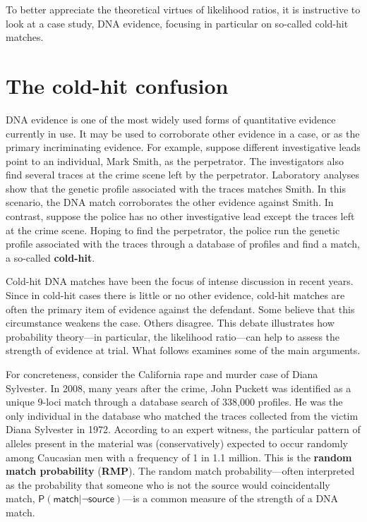 \documentclass[10pt,dvipsnames,enabledeprecatedfontcommands]{scrartcl}
\newcommand{\pr}[1]{\mathsf{P}(#1)}
\begin{document}
To better appreciate the theoretical virtues of likelihood ratios, it is
instructive to look at a case study, DNA evidence, focusing in
particular on so-called cold-hit matches.

\hypertarget{the-cold-hit-confusion}{%
\section{\texorpdfstring{The cold-hit confusion
\label{subsec:coldHitConfusion}}{The cold-hit confusion }}\label{the-cold-hit-confusion}}

DNA evidence is one of the most widely used forms of quantitative
evidence currently in use. It may be used to corroborate other evidence
in a case, or as the primary incriminating evidence. For example,
suppose different investigative leads point to an individual, Mark
Smith, as the perpetrator. The investigators also find several traces at
the crime scene left by the perpetrator. Laboratory analyses show that
the genetic profile associated with the traces matches Smith. In this
scenario, the DNA match corroborates the other evidence against Smith.
In contrast, suppose the police has no other investigative lead except
the traces left at the crime scene. Hoping to find the perpetrator, the
police run the genetic profile associated with the traces through a
database of profiles and find a match, a so-called \textbf{cold-hit}.

Cold-hit DNA matches have been the focus of intense discussion in recent
years. Since in cold-hit cases there is little or no other evidence,
cold-hit matches are often the primary item of evidence against the
defendant. Some believe that this circumstance weakens the case. Others
disagree. This debate illustrates how probability theory---in
particular, the likelihood ratio---can help to assess the strength of
evidence at trial. What follows examines some of the main arguments.

For concreteness, consider the California rape and murder case of Diana
Sylvester. In 2008, many years after the crime, John Puckett was
identified as a unique 9-loci match through a database search of 338,000
profiles. He was the only individual in the database who matched the
traces collected from the victim Diana Sylvester in 1972. According to
an expert witness, the particular pattern of alleles present in the
material was (conservatively) expected to occur randomly among Caucasian
men with a frequency of 1 in 1.1 million. This is the
\textbf{random match probability} (\textbf{RMP}). The random match
probability---often interpreted as the probability that someone who is
not the source would coincidentally match,
\(\pr{\textsf{match} \vert \neg \textsf{source}}\)---is a common measure
of the strength of a DNA match.
\end{document}
